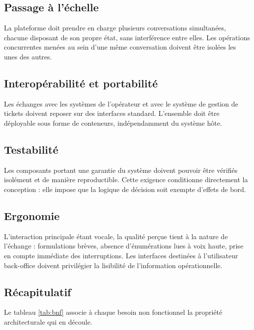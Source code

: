\subsection{Passage à l'échelle}

La plateforme doit prendre en charge plusieurs conversations simultanées, chacune disposant de son propre état, sans interférence entre elles. Les opérations concurrentes menées au sein d'une même conversation doivent être isolées les unes des autres.

\subsection{Interopérabilité et portabilité}

Les échanges avec les systèmes de l'opérateur et avec le système de gestion de tickets doivent reposer sur des interfaces standard. L'ensemble doit être déployable sous forme de conteneurs, indépendamment du système hôte.

\subsection{Testabilité}

Les composants portant une garantie du système doivent pouvoir être vérifiés isolément et de manière reproductible. Cette exigence conditionne directement la conception : elle impose que la logique de décision soit exempte d'effets de bord.

\subsection{Ergonomie}

L'interaction principale étant vocale, la qualité perçue tient à la nature de l'échange : formulations brèves, absence d'énumérations lues à voix haute, prise en compte immédiate des interruptions. Les interfaces destinées à l'utilisateur back-office doivent privilégier la lisibilité de l'information opérationnelle.

\subsection{Récapitulatif}

Le tableau \ref{tab:bnf} associe à chaque besoin non fonctionnel la propriété architecturale qui en découle.

